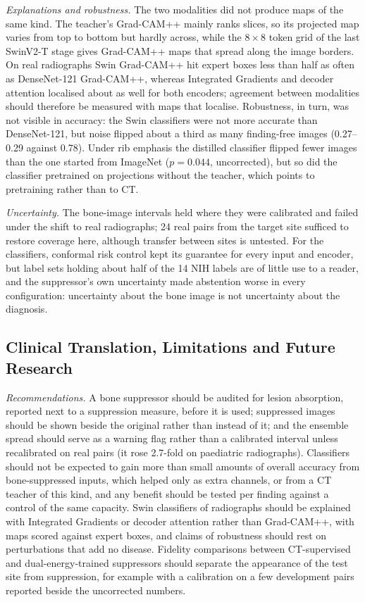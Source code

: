 \emph{Explanations and robustness.} The two modalities did not produce maps of the same kind. The teacher's Grad-CAM++ mainly ranks slices,
so its projected map varies from top to bottom but hardly across, while the $8\times8$ token grid of the last SwinV2-T stage gives
Grad-CAM++ maps that spread along the image borders. On real radiographs Swin Grad-CAM++ hit expert boxes less than half as often as
DenseNet-121 Grad-CAM++, whereas Integrated Gradients and decoder attention localised about as well for both encoders; agreement between
modalities should therefore be measured with maps that localise. Robustness, in turn, was not visible in accuracy: the Swin classifiers were
not more accurate than DenseNet-121, but noise flipped about a third as many finding-free images (0.27--0.29 against 0.78). Under rib
emphasis the distilled classifier flipped fewer images than the one started from ImageNet ($p=0.044$, uncorrected), but so did the classifier
pretrained on projections without the teacher, which points to pretraining rather than to CT.

\emph{Uncertainty.} The bone-image intervals held where they were calibrated and failed under the shift to real radiographs; 24 real pairs
from the target site sufficed to restore coverage here, although transfer between sites is untested. For the classifiers, conformal risk
control kept its guarantee for every input and encoder, but label sets holding about half of the 14 NIH labels are of little use to a
reader, and the suppressor's own uncertainty made abstention worse in every configuration: uncertainty about the bone image is not
uncertainty about the diagnosis.

\subsection{Clinical Translation, Limitations and Future Research}
\label{sec:limitations}
\emph{Recommendations.} A bone suppressor should be audited for lesion absorption, reported next to a suppression measure, before it is
used; suppressed images should be shown beside the original rather than instead of it; and the ensemble spread should serve as a warning
flag rather than a calibrated interval unless recalibrated on real pairs (it rose 2.7-fold on paediatric radiographs). Classifiers should not
be expected to gain more than small amounts of overall accuracy from bone-suppressed inputs, which helped only as extra channels, or from a
CT teacher of this kind, and any benefit should be tested per finding against a control of the same capacity. Swin classifiers of
radiographs should be explained with Integrated Gradients or decoder attention rather than Grad-CAM++, with maps scored against expert
boxes, and claims of robustness should rest on perturbations that add no disease. Fidelity comparisons between CT-supervised and
dual-energy-trained suppressors should separate the appearance of the test site from suppression, for example with a calibration on a few
development pairs reported beside the uncorrected numbers.

